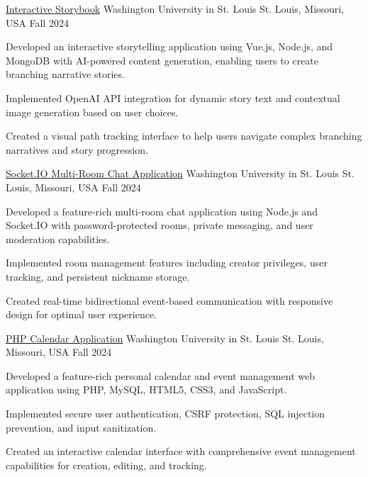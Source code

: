 \documentclass[10pt, letterpaper]{article}
\begin{document}
\begin{projectentry}
    {\href{https://github.com/agopalareddy/CSE503S_Interactive_Storybook}{Interactive Storybook}} %
    {Washington University in St. Louis} %
    {St. Louis, Missouri, USA} %
    {Fall 2024} %
    \item Developed an interactive storytelling application using Vue.js, Node.js, and MongoDB with AI-powered content generation, enabling users to create branching narrative stories.
    \item Implemented OpenAI API integration for dynamic story text and contextual image generation based on user choices.
    \item Created a visual path tracking interface to help users navigate complex branching narratives and story progression.
\end{projectentry}

\begin{projectentry}
    {\href{https://github.com/agopalareddy/CSE503S_Chat_App}{Socket.IO Multi-Room Chat Application}} %
    {Washington University in St. Louis} %
    {St. Louis, Missouri, USA} %
    {Fall 2024} %
    \item Developed a feature-rich multi-room chat application using Node.js and Socket.IO with password-protected rooms, private messaging, and user moderation capabilities.
    \item Implemented room management features including creator privileges, user tracking, and persistent nickname storage.
    \item Created real-time bidirectional event-based communication with responsive design for optimal user experience.
\end{projectentry}

\begin{projectentry}
    {\href{https://github.com/agopalareddy/CSE503S_PHP_Calendar_App}{PHP Calendar Application}} %
    {Washington University in St. Louis} %
    {St. Louis, Missouri, USA} %
    {Fall 2024} %
    \item Developed a feature-rich personal calendar and event management web application using PHP, MySQL, HTML5, CSS3, and JavaScript.
    \item Implemented secure user authentication, CSRF protection, SQL injection prevention, and input sanitization.
    \item Created an interactive calendar interface with comprehensive event management capabilities for creation, editing, and tracking.
\end{projectentry}
\end{document}
